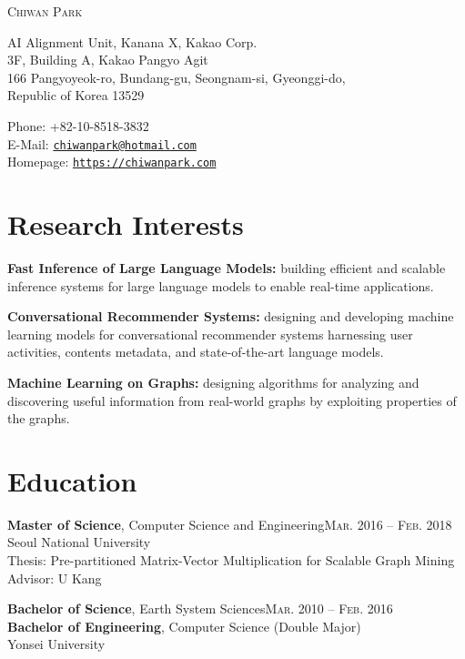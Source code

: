 \documentclass[11pt,a4paper]{article}
\makeatletter
\def\myname{Chiwan Park}
\def\myphone{+82-10-8518-3832}
\def\myaddress{AI Alignment Unit, Kanana X, Kakao Corp.\\
3F, Building A, Kakao Pangyo Agit\\
166 Pangyoyeok-ro, Bundang-gu, Seongnam-si, Gyeonggi-do,\\
Republic of Korea 13529}
\def\myemail{chiwanpark@hotmail.com}
\def\myhomepage{https://chiwanpark.com}
\renewenvironment{itemize}{
  \begin{list}{}{
    \setlength{\leftmargin}{1.5em}
    \setlength{\itemsep}{0.5em}
    \setlength{\parskip}{0pt}
    \setlength{\parsep}{0.25em}
  }
}{
  \end{list}
}
\makeatother
\begin{document}
\par{\Huge \textsc{\myname}}

\bigskip

\begin{minipage}[t]{0.625\textwidth}
  \myaddress
\end{minipage}
\begin{minipage}[t]{0.375\textwidth}
  Phone: \myphone\\
  E-Mail: \href{mailto:\myemail}{\texttt{\myemail}}\\
  Homepage: \href{\myhomepage}{\texttt{\myhomepage}}
\end{minipage}

\section*{Research Interests}
\begin{itemize}
  \item \textbf{Fast Inference of Large Language Models:} building efficient and scalable inference systems for large language models to enable real-time applications.
  \item \textbf{Conversational Recommender Systems:} designing and developing machine learning models for conversational recommender systems harnessing user activities, contents metadata, and state-of-the-art language models.
  \item \textbf{Machine Learning on Graphs:} designing algorithms for analyzing and discovering useful information from real-world graphs by exploiting properties of the graphs.
\end{itemize}

\section*{Education}
\begin{itemize}
  \item \textbf{Master of Science}, Computer Science and Engineering\hfill\textsc{Mar. 2016 -- Feb. 2018}\\
        Seoul National University\\
        Thesis: Pre-partitioned Matrix-Vector Multiplication for Scalable Graph Mining\\
        Advisor: U Kang
  \item \textbf{Bachelor of Science}, Earth System Sciences\hfill\textsc{Mar. 2010 -- Feb. 2016}\\
        \textbf{Bachelor of Engineering}, Computer Science (Double Major)\\
        Yonsei University
\end{itemize}
\end{document}
